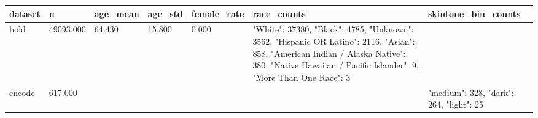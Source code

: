 \begin{tabular}{lllllll}
\toprule
dataset & n & age\_mean & age\_std & female\_rate & race\_counts & skintone\_bin\_counts \\
\midrule
bold & 49093.000 & 64.430 & 15.800 & 0.000 & {"White": 37380, "Black": 4785, "Unknown": 3562, "Hispanic OR Latino": 2116, "Asian": 858, "American Indian / Alaska Native": 380, "Native Hawaiian / Pacific Islander": 9, "More Than One Race": 3} & {} \\
encode & 617.000 &  &  &  & {} & {"medium": 328, "dark": 264, "light": 25} \\
\bottomrule
\end{tabular}
